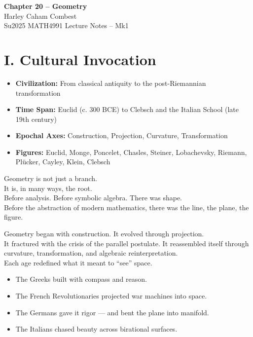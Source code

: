 \documentclass[9pt]{article}
\begin{document}
\begin{center}
\Large\textbf{Chapter 20 – Geometry} \\
\large Harley Caham Combest \\
\large Su2025 MATH4991 Lecture Notes – Mk1
\end{center}

\vspace{1em}

\section*{I. Cultural Invocation}

\begin{itemize}
  \item \textbf{Civilization:} From classical antiquity to the post-Riemannian transformation
  \item \textbf{Time Span:} Euclid (c. 300 BCE) to Clebsch and the Italian School (late 19th century)
  \item \textbf{Epochal Axes:} Construction, Projection, Curvature, Transformation
  \item \textbf{Figures:} Euclid, Monge, Poncelet, Chasles, Steiner, Lobachevsky, Riemann, Plücker, Cayley, Klein, Clebsch
\end{itemize}

Geometry is not just a branch.\\

It is, in many ways, the root.\\

Before analysis. Before symbolic algebra. There was shape.  \\

\noindent
Before the abstraction of modern mathematics, there was the line, the plane, the figure.

\noindent
Geometry began with construction. It evolved through projection.  \\

\noindent
It fractured with the crisis of the parallel postulate.  
It reassembled itself through curvature, transformation, and algebraic reinterpretation.\\

\noindent
Each age redefined what it meant to “see” space.

\begin{itemize}
  \item The Greeks built with compass and reason.
  \item The French Revolutionaries projected war machines into space.
  \item The Germans gave it rigor — and bent the plane into manifold.
  \item The Italians chased beauty across birational surfaces.
\end{itemize}
\end{document}
